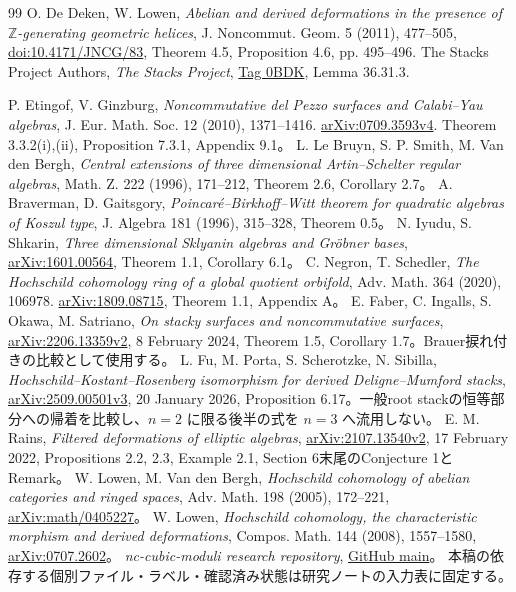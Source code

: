 \documentclass[11pt,a4paper]{ltjsarticle}
\theoremstyle{definition}\newtheorem{definition}[theorem]{定義}
\theoremstyle{remark}\newtheorem{remark}[theorem]{注意}
\begin{document}
\begin{thebibliography}{99}
 O. De Deken, W. Lowen,
\emph{Abelian and derived deformations in the presence of $\mathbb Z$-generating geometric helices},
J. Noncommut. Geom. 5 (2011), 477--505,
\href{https://doi.org/10.4171/JNCG/83}{doi:10.4171/JNCG/83}, Theorem 4.5, Proposition 4.6, pp. 495--496.
 The Stacks Project Authors,
\emph{The Stacks Project},
\href{https://stacks.math.columbia.edu/tag/0BDK}{Tag 0BDK}, Lemma 36.31.3.

 P. Etingof, V. Ginzburg,
\emph{Noncommutative del Pezzo surfaces and Calabi--Yau algebras},
J. Eur. Math. Soc. 12 (2010), 1371--1416.
\href{https://arxiv.org/abs/0709.3593v4}{arXiv:0709.3593v4}.
Theorem 3.3.2(i),(ii), Proposition 7.3.1, Appendix 9.1。
 L. Le Bruyn, S. P. Smith, M. Van den Bergh,
\emph{Central extensions of three dimensional Artin--Schelter regular algebras},
Math. Z. 222 (1996), 171--212, Theorem 2.6, Corollary 2.7。
 A. Braverman, D. Gaitsgory,
\emph{Poincar\'e--Birkhoff--Witt theorem for quadratic algebras of Koszul type},
J. Algebra 181 (1996), 315--328, Theorem 0.5。
 N. Iyudu, S. Shkarin,
\emph{Three dimensional Sklyanin algebras and Gr\"obner bases},
\href{https://arxiv.org/abs/1601.00564}{arXiv:1601.00564}, Theorem 1.1, Corollary 6.1。
 C. Negron, T. Schedler,
\emph{The Hochschild cohomology ring of a global quotient orbifold},
Adv. Math. 364 (2020), 106978.
\href{https://arxiv.org/abs/1809.08715}{arXiv:1809.08715}, Theorem 1.1, Appendix A。
 E. Faber, C. Ingalls, S. Okawa, M. Satriano,
\emph{On stacky surfaces and noncommutative surfaces},
\href{https://arxiv.org/abs/2206.13359v2}{arXiv:2206.13359v2}, 8 February 2024,
Theorem 1.5, Corollary 1.7。Brauer捩れ付きの比較として使用する。
 L. Fu, M. Porta, S. Scherotzke, N. Sibilla,
\emph{Hochschild--Kostant--Rosenberg isomorphism for derived Deligne--Mumford stacks},
\href{https://arxiv.org/abs/2509.00501v3}{arXiv:2509.00501v3}, 20 January 2026,
Proposition 6.17。一般root stackの恒等部分への帰着を比較し、$n=2$ に限る後半の式を $n=3$ へ流用しない。
 E. M. Rains,
\emph{Filtered deformations of elliptic algebras},
\href{https://arxiv.org/abs/2107.13540v2}{arXiv:2107.13540v2}, 17 February 2022,
Propositions 2.2, 2.3, Example 2.1, Section 6末尾のConjecture 1とRemark。
 W. Lowen, M. Van den Bergh,
\emph{Hochschild cohomology of abelian categories and ringed spaces},
Adv. Math. 198 (2005), 172--221,
\href{https://arxiv.org/abs/math/0405227}{arXiv:math/0405227}。
 W. Lowen,
\emph{Hochschild cohomology, the characteristic morphism and derived deformations},
Compos. Math. 144 (2008), 1557--1580,
\href{https://arxiv.org/abs/0707.2602}{arXiv:0707.2602}。
 \emph{nc-cubic-moduli research repository},
\href{https://github.com/uedakazushi/nc-cubic-moduli}{GitHub main}。
本稿の依存する個別ファイル・ラベル・確認済み状態は研究ノートの入力表に固定する。
\end{thebibliography}
\end{document}
